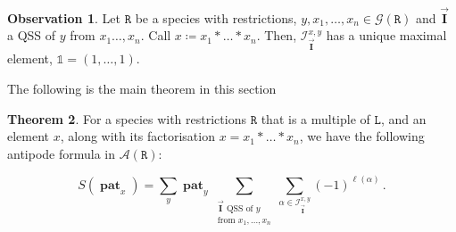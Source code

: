 \documentclass[12pt, reqno]{amsart}
\theoremstyle{definition}
\newtheorem{thm}{Theorem}[section]
\newtheorem{obs}[thm]{Observation}
\newcommand{\III}{\vec{\mathbf{I}}}
\DeclareMathOperator{\pat}{\mathbf{pat}}
\begin{document}
\


\begin{obs}
Let $\mathtt{R}$ be a species with restrictions, $y, x_1, \dots, x_n \in \mathcal G(\mathtt{R})$ and $\III$ a QSS of $y$ from $x_1\dots, x_n$.
Call $x \coloneqq x_1 \ast \dots \ast x_n$.
Then, $\mathcal I^{x, y}_{\III}$ has a unique maximal element, $\mathbb{1} = (1, \dots, 1)$.
\end{obs}

The following is the main theorem in this section

\begin{thm}\label{thm:general_antipode}
For a species with restrictions $\mathtt{R}$ that is a multiple of $\mathtt{L}$, and an element $x$, along with its factorisation $x=x_1 \ast \dots \ast x_n$, we have the following antipode formula in $\mathcal A (\mathtt{R})$:

$$S(\pat_x) = \sum_y \pat_y \sum_{\substack{\III \text{ QSS of $y$}\\ \text{from }x_1, \dots , x_n}}  \sum_{\alpha \in \mathcal I^{x, y}_{\III}} (-1)^{\ell ( \alpha)} \, .$$
\end{thm}
\end{document}
